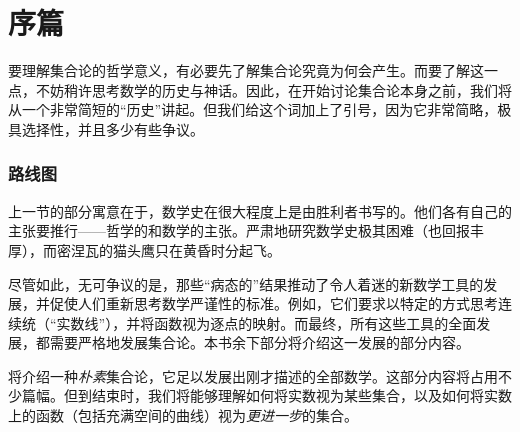 %

\preto{}

\problemsperchapter

\allowdisplaybreaks

\frontmatter

\OLPfrontmatter



\mainmatter

\part{序篇}


要理解集合论的哲学意义，有必要先了解集合论究竟为何会产生。而要了解这一点，不妨稍许思考数学的历史与神话。因此，在开始讨论集合论本身之前，我们将从一个非常简短的“历史”讲起。但我们给这个词加上了引号，因为它非常简略，极具选择性，并且多少有些争议。


\section{路线图}

上一节的部分寓意在于，数学史在很大程度上是由胜利者书写的。他们各有自己的主张要推行——哲学的和数学的主张。严肃地研究数学史极其困难（也回报丰厚），而密涅瓦的猫头鹰只在黄昏时分起飞。

尽管如此，无可争议的是，那些“病态的”结果推动了令人着迷的新数学工具的发展，并促使人们重新思考数学严谨性的标准。例如，它们要求以特定的方式思考连续统（“实数线”），并将函数视为逐点的映射。而最终，所有这些工具的全面发展，都需要严格地发展集合论。本书余下部分将介绍这一发展的部分内容。

将介绍一种\emph{朴素}集合论，它足以发展出刚才描述的全部数学。这部分内容将占用不少篇幅。但到结束时，我们将能够理解如何将实数视为某些集合，以及如何将实数上的函数（包括充满空间的曲线）视为\emph{更进一步}的集合。

